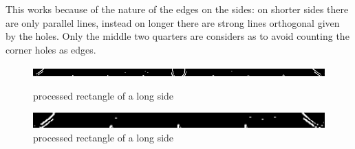 This works because of the nature of the edges on the sides: on shorter sides there
are only parallel lines, instead on longer there are strong lines orthogonal given by the holes.
Only the middle two quarters are considers as to avoid counting the corner holes as edges.
\begin{figure}
\includegraphics[width=1.0\textwidth]{./imgs/sobel_long_side.png}
\caption{processed rectangle of a long side}\par
\vspace{30}
\includegraphics[width=1.0\textwidth]{./imgs/sobel_short_side.png}
\caption{processed rectangle of a long side}
\end{figure}
